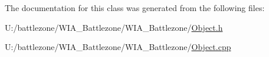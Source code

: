The documentation for this class was generated from the following files:\begin{DoxyCompactItemize}
\item 
U:/battlezone/WIA\_\-Battlezone/WIA\_\-Battlezone/\hyperlink{_object_8h}{Object.h}\item 
U:/battlezone/WIA\_\-Battlezone/WIA\_\-Battlezone/\hyperlink{_object_8cpp}{Object.cpp}\end{DoxyCompactItemize}
